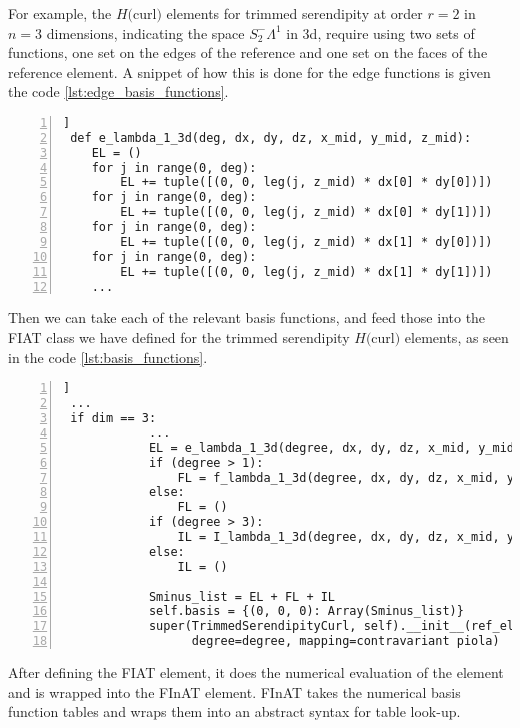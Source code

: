 \documentclass[manuscript,screen]{acmart}
\begin{document}
 For example, the $H($curl$)$ elements for trimmed serendipity at order $r=2$ in $n=3$ dimensions, indicating the space $S_2^- \Lambda^1$ in 3d, require using two sets of functions, one set on the edges of the reference and one set on the faces of the reference element.  A snippet of how this is done for the edge functions is given the code \ref{lst:edge_basis_functions}.
 
 \lstset{language=Python}
 \begin{lstlisting}[frame=single, caption={Portion of edge basis function implementation.}, label={lst:edge_basis_functions}, numbers=left]]
 def e_lambda_1_3d(deg, dx, dy, dz, x_mid, y_mid, z_mid):
    EL = ()
    for j in range(0, deg):
        EL += tuple([(0, 0, leg(j, z_mid) * dx[0] * dy[0])])
    for j in range(0, deg):
        EL += tuple([(0, 0, leg(j, z_mid) * dx[0] * dy[1])])
    for j in range(0, deg):
        EL += tuple([(0, 0, leg(j, z_mid) * dx[1] * dy[0])])
    for j in range(0, deg):
        EL += tuple([(0, 0, leg(j, z_mid) * dx[1] * dy[1])])
    ...
 \end{lstlisting}
 
 Then we can take each of the relevant basis functions, and feed those into the FIAT class we have defined for the trimmed serendipity $H($curl$)$ elements, as seen in the code \ref{lst:basis_functions}.
 
\lstset{language=Python}
 \begin{lstlisting}[frame=single, caption={Collecting the basis functions for the trimmed serendipity class inside FIAT.}, label={lst:basis_functions}, numbers=left]] 
 ...
 if dim == 3:
            ...
            EL = e_lambda_1_3d(degree, dx, dy, dz, x_mid, y_mid, z_mid)
            if (degree > 1):
                FL = f_lambda_1_3d(degree, dx, dy, dz, x_mid, y_mid, z_mid)
            else:
                FL = ()
            if (degree > 3):
                IL = I_lambda_1_3d(degree, dx, dy, dz, x_mid, y_mid, z_mid)
            else:
                IL = ()

            Sminus_list = EL + FL + IL
            self.basis = {(0, 0, 0): Array(Sminus_list)}
            super(TrimmedSerendipityCurl, self).__init__(ref_el=ref_el,
                  degree=degree, mapping=contravariant piola)
\end{lstlisting}

After defining the FIAT element, it does the numerical evaluation of the element and is wrapped into the FInAT element.  FInAT takes the numerical basis function tables and wraps them into an abstract syntax for table look-up.    
\end{document}
